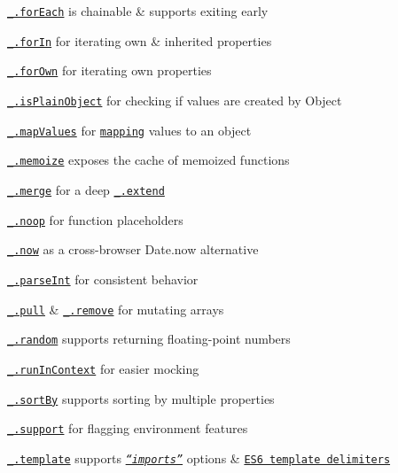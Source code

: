 \begin{DoxyItemize}
\item \href{https://lodash.com/docs#forEach}{\tt \+\_\+.\+for\+Each} is chainable \& supports exiting early
\item \href{https://lodash.com/docs#forIn}{\tt \+\_\+.\+for\+In} for iterating own \& inherited properties
\item \href{https://lodash.com/docs#forOwn}{\tt \+\_\+.\+for\+Own} for iterating own properties
\item \href{https://lodash.com/docs#isPlainObject}{\tt \+\_\+.\+is\+Plain\+Object} for checking if values are created by {\ttfamily Object}
\item \href{https://lodash.com/docs#mapValues}{\tt \+\_\+.\+map\+Values} for \href{https://lodash.com/docs#map}{\tt mapping} values to an object
\item \href{https://lodash.com/docs#memoize}{\tt \+\_\+.\+memoize} exposes the {\ttfamily cache} of memoized functions
\item \href{https://lodash.com/docs#merge}{\tt \+\_\+.\+merge} for a deep \href{https://lodash.com/docs#extend}{\tt \+\_\+.\+extend}
\item \href{https://lodash.com/docs#noop}{\tt \+\_\+.\+noop} for function placeholders
\item \href{https://lodash.com/docs#now}{\tt \+\_\+.\+now} as a cross-\/browser {\ttfamily Date.\+now} alternative
\item \href{https://lodash.com/docs#parseInt}{\tt \+\_\+.\+parse\+Int} for consistent behavior
\item \href{https://lodash.com/docs#pull}{\tt \+\_\+.\+pull} \& \href{https://lodash.com/docs#remove}{\tt \+\_\+.\+remove} for mutating arrays
\item \href{https://lodash.com/docs#random}{\tt \+\_\+.\+random} supports returning floating-\/point numbers
\item \href{https://lodash.com/docs#runInContext}{\tt \+\_\+.\+run\+In\+Context} for easier mocking
\item \href{https://lodash.com/docs#sortBy}{\tt \+\_\+.\+sort\+By} supports sorting by multiple properties
\item \href{https://lodash.com/docs#support}{\tt \+\_\+.\+support} for flagging environment features
\item \href{https://lodash.com/docs#template}{\tt \+\_\+.\+template} supports \href{https://lodash.com/docs#templateSettings_imports}{\tt {\itshape “imports”}} options \& \href{http://people.mozilla.org/~jorendorff/es6-draft.html#sec-literals-string-literals}{\tt E\+S6 template delimiters}

\end{DoxyItemize}
